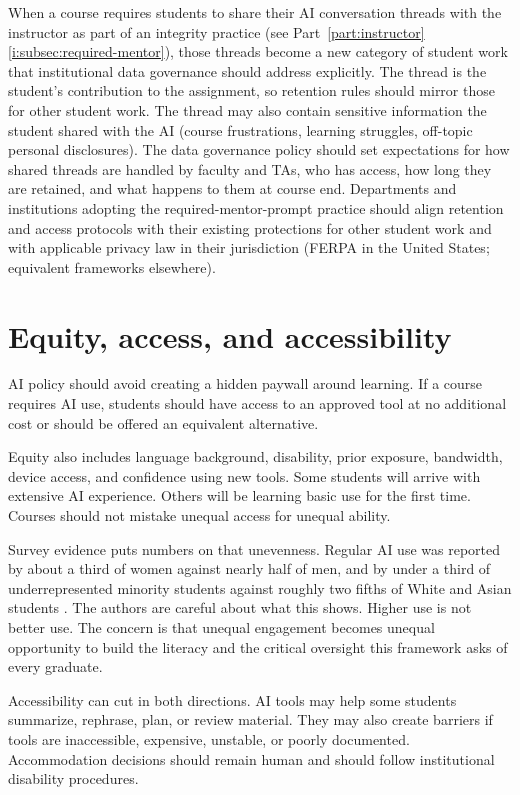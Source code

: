 \documentclass{SIAMbook2023}
\begin{document}
When a course requires students to share their AI conversation threads with the instructor as part of an integrity practice (see Part~\ref{part:instructor} \cref{i:subsec:required-mentor}), those threads become a new category of student work that institutional data governance should address explicitly. The thread is the student's contribution to the assignment, so retention rules should mirror those for other student work. The thread may also contain sensitive information the student shared with the AI (course frustrations, learning struggles, off-topic personal disclosures). The data governance policy should set expectations for how shared threads are handled by faculty and TAs, who has access, how long they are retained, and what happens to them at course end. Departments and institutions adopting the required-mentor-prompt practice should align retention and access protocols with their existing protections for other student work and with applicable privacy law in their jurisdiction (FERPA in the United States; equivalent frameworks elsewhere).

\section{Equity, access, and accessibility}
\label{u:sec:equity}%

AI policy should avoid creating a hidden paywall around learning. If a course requires AI use, students should have access to an approved tool at no additional cost or should be offered an equivalent alternative.

Equity also includes language background, disability, prior exposure, bandwidth, device access, and confidence using new tools. Some students will arrive with extensive AI experience. Others will be learning basic use for the first time. Courses should not mistake unequal access for unequal ability.

Survey evidence puts numbers on that unevenness. Regular AI use was reported by about a third of women against nearly half of men, and by under a third of underrepresented minority students against roughly two fifths of White and Asian students \citep{chirikov2026generative}. The authors are careful about what this shows. Higher use is not better use. The concern is that unequal engagement becomes unequal opportunity to build the literacy and the critical oversight this framework asks of every graduate.

Accessibility can cut in both directions. AI tools may help some students summarize, rephrase, plan, or review material. They may also create barriers if tools are inaccessible, expensive, unstable, or poorly documented. Accommodation decisions should remain human and should follow institutional disability procedures.
\end{document}
